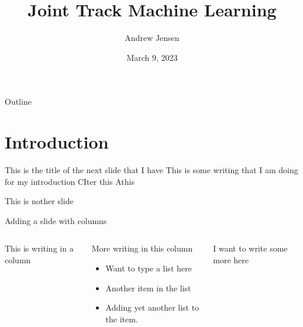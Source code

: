 \documentclass[presentation]{beamer}
\author{Andrew Jensen}
\date{March 9, 2023}
\title{Joint Track Machine Learning}
\begin{document}
\maketitle
\begin{frame}{Outline}
\tableofcontents
\end{frame}


\section{Introduction}
\label{sec:org2b9237e}
\begin{frame}[label={sec:org841db8f}]{This is the title of the next slide that I have}
This is some writing that I am doing for my introduction
CIter this
Athis
\end{frame}

\begin{frame}[label={sec:org5dd7a2e}]{This is nother slide}
\autocite{banksAccurateMeasurementThreedimensional1996}
\autocites{banksAccurateMeasurementThreedimensional1996}[][]{jensenJointTrackMachine2022}[][]{cannyFindingEdgesLines1983}
\end{frame}

\begin{frame}[label={sec:orgbbf1ff8}]{Adding a slide with columns}
\begin{columns}
\begin{column}{0.4\columnwidth}
This is writing in a column
\end{column}
\begin{column}{0.47\columnwidth}
More writing in this column
\begin{itemize}
\item Want to type a list here
\item Another item in the list
\item Adding yet another list to the item.
\end{itemize}
\end{column}

\begin{column}{0.2\columnwidth}
I want to write some more here
\end{column}
\end{columns}
\end{frame}
\end{document}
